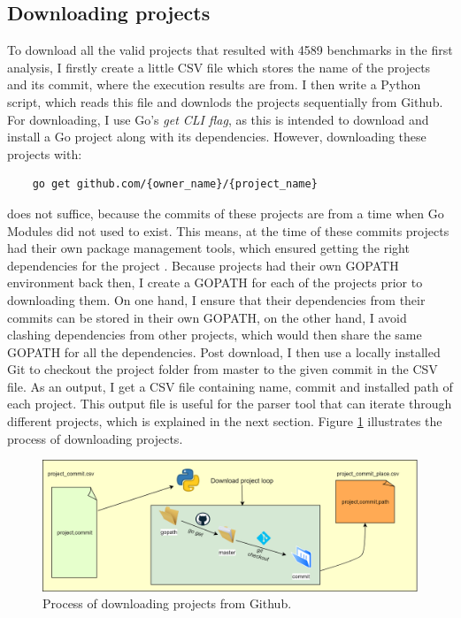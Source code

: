 \documentclass{seal_thesis}
\begin{document}
\subsection{Downloading projects}

To download all the valid projects that resulted with 4589 benchmarks in the first analysis, I firstly create a little CSV file which stores the name of the projects and its commit, where the execution results are from. I then write a Python script, which reads this file and downlods the projects sequentially from Github. For downloading, I use Go's \textit{get CLI flag}, as this is intended to download and install a Go project along with its dependencies. However, downloading these projects with:
\begin{lstlisting}
	go get github.com/{owner_name}/{project_name}
\end{lstlisting}

\noindent does not suffice, because the commits of these projects are from a time when Go Modules did not used to exist. This means, at the time of these commits projects had their own package management tools, which ensured getting the right dependencies for the project \cite{packagemanagement}. Because projects had their own GOPATH environment back then, I create a GOPATH for each of the projects prior to downloading them. On one hand, I ensure that their dependencies from their commits can be stored in their own GOPATH, on the other hand, I avoid clashing dependencies from other projects, which would then share the same GOPATH for all the dependencies. Post download, I then use a locally installed Git to checkout the project folder from master to the given commit in the CSV file. As an output, I get a CSV file containing name, commit and installed path of each project. This output file is useful for the parser tool that can iterate through different projects, which is explained in the next section. Figure \ref{fig:downloadproject} illustrates the process of downloading projects.

\begin{figure}[H]
	\centering
	\includegraphics[width=\linewidth]{downloadproject}
	\caption{Process of downloading projects from Github.}
	\label{fig:downloadproject}
\end{figure}
\end{document}
